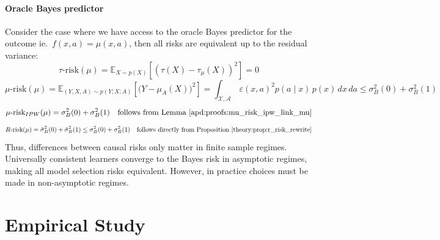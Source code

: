 \documentclass[10pt]{article}
\begin{document}
\begin{multicols}{2}
    \paragraph{Oracle Bayes predictor}\label{remark:bayes_oracle} Consider the case
    where we have access to the oracle Bayes predictor for the outcome ie.~$f(x,
        a)=\mu(x, a)$, then all risks are equivalent up to the residual variance:
    \begin{equation}
        \tau\text{-risk}(\mu) = \mathbb E_{X\sim p(X)}[(\tau(X) - \tau_{\mu}(X))^2] = 0
    \end{equation}
    \begin{equation}
        \mu\text{-risk}(\mu) = \mathbb E_{(Y, X, A) \sim p(Y;X;A)}[\big( Y - \mu_A(X)\big)^2] = \int_{\mathcal X, \mathcal A}
        \,\varepsilon(x,a)^2 p(a \mid x) \,p(x) \,dx\,da  \leq \sigma_B^{2}(0) + \sigma_B^{2}(1)
    \end{equation}
    \hspace*{0.5em}
    \begin{equation}
        \mu\text{-risk}_{IPW}(\mu) = \sigma_B^{2}(0) + \sigma_B^{2}(1)  \quad \text{follows from Lemma \ref{apd:proofs:mu_risk_ipw_link_mu}}
    \end{equation}
    \hspace*{0.5em}
    \begin{equation}
        R\text{-risk}(\mu) = \tilde{\sigma}_B^{2}(0) + \tilde{\sigma}_B^{2}(1)
        \leq \sigma_B^{2}(0) + \sigma_B^{2}(1) \quad \text{follows directly from Proposition \ref{theory:prop:r_risk_rewrite}}%
    \end{equation}
    Thus, differences between causal risks only matter in finite sample regimes.
    Universally consistent learners converge to the Bayes risk in asymptotic
    regimes, making all model selection risks equivalent. However, in practice
    choices must be made in non-asymptotic regimes.

    \section{Empirical Study}\label{sec:empirical_study}



\end{multicols}
\end{document}
